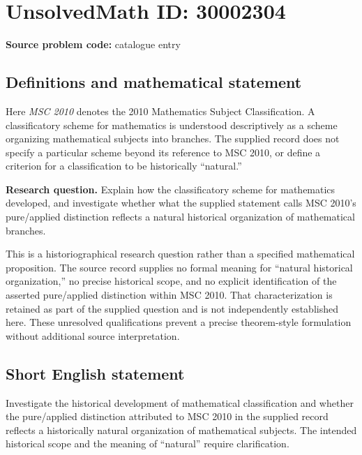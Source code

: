 \documentclass[11pt]{article}
\begin{document}
\section*{UnsolvedMath ID: 30002304}
\textbf{Source problem code:} catalogue entry
\subsection{Definitions and mathematical statement}
Here \emph{MSC 2010} denotes the 2010 Mathematics Subject Classification. A classificatory scheme for mathematics is understood descriptively as a scheme organizing mathematical subjects into branches. The supplied record does not specify a particular scheme beyond its reference to MSC 2010, or define a criterion for a classification to be historically ``natural.''

\textbf{Research question.} Explain how the classificatory scheme for mathematics developed, and investigate whether what the supplied statement calls MSC 2010's pure/applied distinction reflects a natural historical organization of mathematical branches.

This is a historiographical research question rather than a specified mathematical proposition. The source record supplies no formal meaning for ``natural historical organization,'' no precise historical scope, and no explicit identification of the asserted pure/applied distinction within MSC 2010. That characterization is retained as part of the supplied question and is not independently established here. These unresolved qualifications prevent a precise theorem-style formulation without additional source interpretation.
\subsection{Short English statement}
Investigate the historical development of mathematical classification and whether the pure/applied distinction attributed to MSC 2010 in the supplied record reflects a historically natural organization of mathematical subjects. The intended historical scope and the meaning of ``natural'' require clarification.
\end{document}
